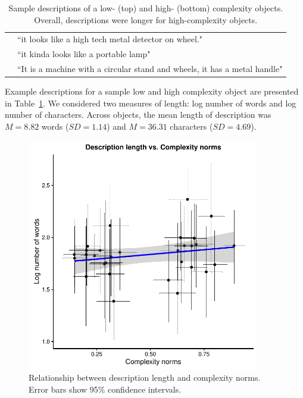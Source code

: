 \begin{table}[t!]
\begin{tabular}{ll}
                   & ``it looks like a high tech metal detector on wheel."                                   \\
                   & ``it kinda looks like a portable lamp"                                \\  
                   & ``It is a machine with a circular stand and wheels, it has a metal handle"\\
   \bottomrule
\end{tabular}
\caption{Sample descriptions of a low- (top) and high- (bottom)  complexity objects.  Overall, descriptions were longer for high-complexity objects.}
\label{tab:sample_obj_descriptions}
\end{table}


Example descriptions for a sample low and high complexity object are presented in Table~\ref{tab:sample_obj_descriptions}. We considered two measures of length:  log number of words and log number of characters. Across objects, the mean length of description was  $M = 8.82$ words ($SD = 1.14$) and $M = 36.31$ characters ($SD = 4.69$).

 \begin{figure}
 \begin{center}
  \includegraphics[width=4in]{figs/desc_length_word.pdf}
  \caption{\label{fig:desc_length} Relationship between description length and complexity norms. Error bars show  95\% confidence intervals.}
 \end{center}
\end{figure}


